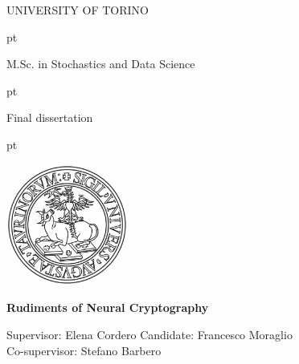 \documentclass[%
    corpo=11pt,
    twoside,
    stile=classica,
    oldstyle,
    autoretitolo,
    tipotesi=magistrale,
    greek,
    evenboxes,
    english
]{toptesi}
\begin{document}

\thispagestyle{empty}

\centerline {\huge{\textsc{UNIVERSITY OF TORINO}}}
 pt

%
%
%
%
%
%
\centerline {\LARGE{\textsc M.Sc. in Stochastics and Data Science}}
 pt

\centerline {\Large{\textsc Final dissertation}}
 pt





\centerline {\includegraphics[width=4cm]{logounito.pdf}}

\vskip 1cm


\vskip 0.7cm

\begin{center} %
\Large \bf Rudiments of Neural Cryptography\\

\end{center}

\vskip 1.7cm
\large
\noindent  Supervisor: Elena Cordero  \hfill  {Candidate: Francesco Moraglio}\\
\noindent Co-supervisor: Stefano Barbero
\end{document}
